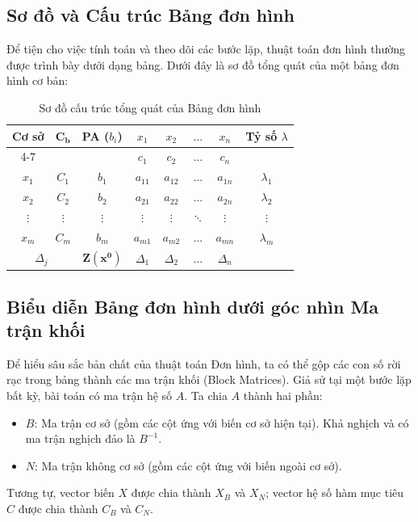 \subsection{Sơ đồ và Cấu trúc Bảng đơn hình}

Để tiện cho việc tính toán và theo dõi các bước lặp, thuật toán đơn hình thường được trình bày dưới dạng bảng. Dưới đây là sơ đồ tổng quát của một bảng đơn hình cơ bản:

\begin{table}[htbp]
    \centering
    \renewcommand{\arraystretch}{1.3}
    \begin{tabular}{|c|c|c|c|c|c|c|c|}
        \hline
        \multirow{2}{*}{\textbf{Cơ sở}} & \multirow{2}{*}{$\mathbf{C_b}$} & \multirow{2}{*}{\textbf{PA ($b_i$)}} & $x_1$ & $x_2$ & $\dots$ & $x_n$ & \multirow{2}{*}{\textbf{Tỷ số $\lambda$}} \\
        \cline{4-7}
        & & & $c_1$ & $c_2$ & $\dots$ & $c_n$ & \\
        \hline
        $x_1$ & $C_1$ & $b_1$ & $a_{11}$ & $a_{12}$ & $\dots$ & $a_{1n}$ & $\lambda_1$ \\
        \hline
        $x_2$ & $C_2$ & $b_2$ & $a_{21}$ & $a_{22}$ & $\dots$ & $a_{2n}$ & $\lambda_2$ \\
        \hline
        $\vdots$ & $\vdots$ & $\vdots$ & $\vdots$ & $\vdots$ & $\ddots$ & $\vdots$ & $\vdots$ \\
        \hline
        $x_m$ & $C_m$ & $b_m$ & $a_{m1}$ & $a_{m2}$ & $\dots$ & $a_{mn}$ & $\lambda_m$ \\
        \hline
        \multicolumn{2}{|c|}{$\Delta_j$} & $\mathbf{Z(x^0)}$ & $\Delta_1$ & $\Delta_2$ & $\dots$ & $\Delta_n$ & \\
        \hline
    \end{tabular}
    \caption{Sơ đồ cấu trúc tổng quát của Bảng đơn hình}
\end{table}

\vspace{0.5cm}
\subsection{Biểu diễn Bảng đơn hình dưới góc nhìn Ma trận khối}

Để hiểu sâu sắc bản chất của thuật toán Đơn hình, ta có thể gộp các con số rời rạc trong bảng thành các ma trận khối (Block Matrices). Giả sử tại một bước lặp bất kỳ, bài toán có ma trận hệ số $A$. Ta chia $A$ thành hai phần: 
\begin{itemize}
    \item $B$: Ma trận cơ sở (gồm các cột ứng với biến cơ sở hiện tại). Khả nghịch và có ma trận nghịch đảo là $B^{-1}$.
    \item $N$: Ma trận không cơ sở (gồm các cột ứng với biến ngoài cơ sở).
\end{itemize}
Tương tự, vector biến $X$ được chia thành $X_B$ và $X_N$; vector hệ số hàm mục tiêu $C$ được chia thành $C_B$ và $C_N$. 

